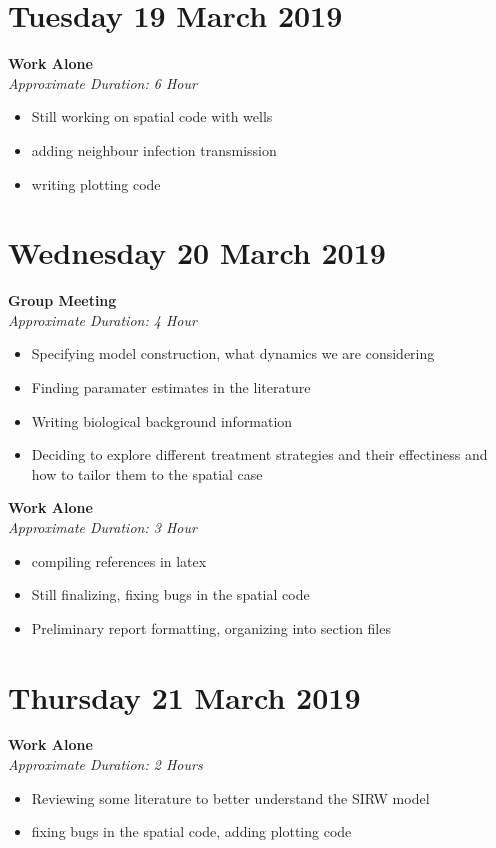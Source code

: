 \documentclass[12pt]{article}\usepackage[]{graphicx}\usepackage[]{color}
\begin{document}
\section*{Tuesday 19 March 2019}
\textbf{Work Alone} \\
\emph{Approximate Duration: 6 Hour}
\begin{itemize}
    \item Still working on spatial code with wells
    \item adding neighbour infection transmission
    \item writing plotting code
\end{itemize}
\section*{Wednesday 20 March 2019}
\textbf{Group Meeting} \\
\emph{Approximate Duration: 4 Hour}
\begin{itemize}
    \item Specifying model construction, what dynamics we are considering
    \item Finding paramater estimates in the literature
    \item Writing biological background information
    \item Deciding to explore different treatment strategies and their effectiness and how to tailor them to the spatial case
\end{itemize}
\textbf{Work Alone} \\
\emph{Approximate Duration: 3 Hour}
\begin{itemize}
    \item compiling references in latex
    \item Still finalizing, fixing bugs in the spatial code
    \item Preliminary report formatting, organizing into section files
\end{itemize}
\section*{Thursday 21 March 2019}
\textbf{Work Alone} \\
\emph{Approximate Duration: 2 Hours}
\begin{itemize}
    \item Reviewing some literature to better understand the SIRW model
    \item fixing bugs in the spatial code, adding plotting code
\end{itemize}
\end{document}
